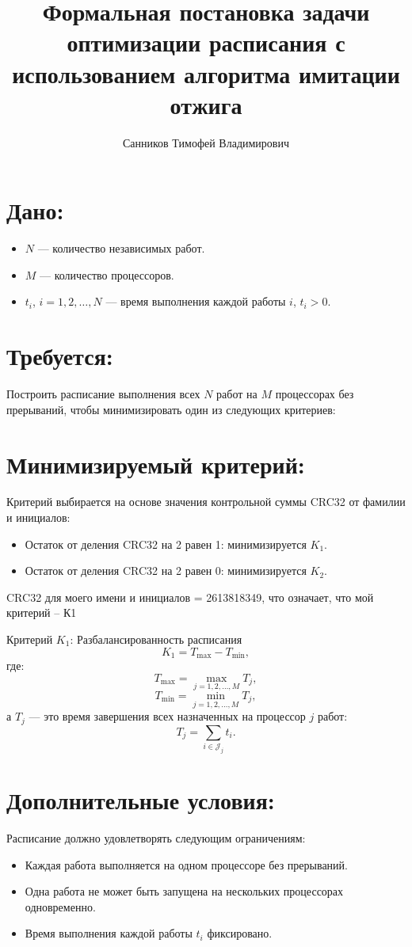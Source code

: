 \documentclass{article}
\begin{document}
	\title{Формальная постановка задачи оптимизации расписания с использованием алгоритма имитации отжига}
	\author{Санников Тимофей Владимирович}
	\date{}
	\maketitle
	
	\section*{Дано:}
	
	\begin{itemize}
	    \item \( N \) — количество независимых работ.
	    \item \( M \) — количество процессоров.
	    \item \( t_i \), \( i = 1, 2, \dots, N \) — время выполнения каждой работы \( i \), \( t_i > 0 \).
	\end{itemize}
	
	\section*{Требуется:}
	
	Построить расписание выполнения всех
	\( N \) работ на \( M \) процессорах без прерываний,
	чтобы минимизировать один из следующих критериев:
	
	\section*{Минимизируемый критерий:}
	
		
	Критерий выбирается на основе значения контрольной суммы CRC32 от фамилии и инициалов:
	\begin{itemize}
	    \item Остаток от деления CRC32 на 2 равен 1: минимизируется \( K_1 \).
	    \item Остаток от деления CRC32 на 2 равен 0: минимизируется \( K_2 \).
	\end{itemize}
	CRC32 для моего имени и инициалов = 2613818349, что означает, что мой критерий -- К1
	

	Критерий \( K_1 \): Разбалансированность расписания
	\[
	K_1 = T_{\text{max}} - T_{\text{min}},
	\]
	где:
	\[
	T_{\text{max}} = \max_{j=1, 2, \dots, M} T_j,
	\]
	\[
	T_{\text{min}} = \min_{j=1, 2, \dots, M} T_j,
	\]
	а \( T_j \) — это время завершения всех назначенных на процессор \( j \) работ:
	\[
	T_j = \sum_{i \in \mathcal{J}_j} t_i.
	\]
	\section*{Дополнительные условия:}
	
	Расписание должно удовлетворять следующим ограничениям:
	\begin{itemize}
	    \item Каждая работа выполняется на одном процессоре без прерываний.
	    \item Одна работа не может быть запущена на нескольких процессорах одновременно.
	    \item Время выполнения каждой работы \( t_i \) фиксировано.
	\end{itemize}
\end{document}
